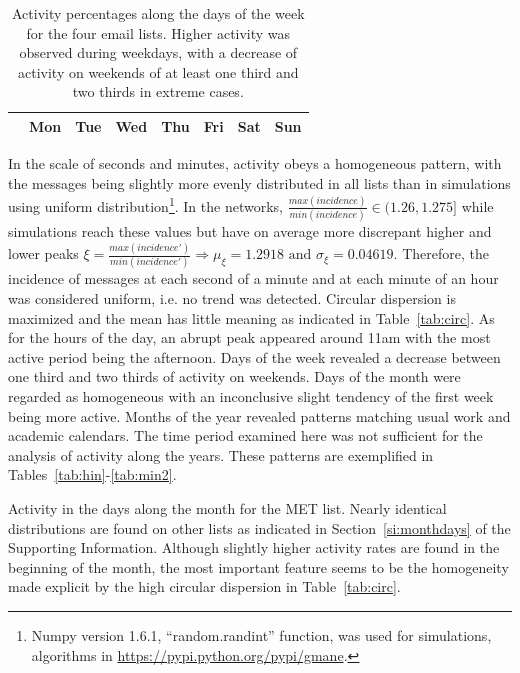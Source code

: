 \documentclass[%
	aip,
	jmp,%
	amsmath,amssymb,
	reprint,%
]{revtex4-1}
\begin{document}
\begin{table}
	\caption{Activity percentages along the days of the week for the four email lists. Higher activity was observed during weekdays, with a decrease of activity on weekends of at least one third and two thirds in extreme cases.}
	\begin{center}
		\begin{tabular}{ | l |  c | c | c | c | c |   c | c |}
			\hline
			& Mon & Tue & Wed & Thu & Fri & Sat & Sun  \\ \hline
			
		\end{tabular}
	\end{center}
	\label{tab:win}
\end{table}
In the scale of seconds and minutes, activity obeys a homogeneous pattern, with the messages being slightly more evenly distributed in all lists than in simulations using uniform distribution\footnote{Numpy version 1.6.1, ``random.randint'' function, was used for simulations, algorithms in \url{https://pypi.python.org/pypi/gmane}.}. In the networks, $\frac{max(incidence)}{min(incidence)} \in (1.26,1.275]$ while simulations reach these values but have on average more discrepant higher and lower peaks $\xi=\frac{max(incidence')}{min(incidence')} \Rightarrow \mu_\xi=1.2918 \text{ and } \sigma_\xi=0.04619$.
Therefore, the incidence of messages at each second of a minute and at each minute of an hour was considered uniform, i.e. no trend was detected. Circular dispersion is maximized and the mean has little meaning as indicated in Table~\ref{tab:circ}. As for the hours of the day, an abrupt peak appeared around 11am with the most active period being the afternoon. Days of the week revealed a decrease between one third and two thirds of activity on weekends. Days of the month were regarded as homogeneous with an inconclusive slight tendency of the first week being more active. Months of the year revealed patterns matching usual work and academic calendars. The time period examined here was not sufficient for the analysis of activity along the years. These patterns are exemplified in Tables~\ref{tab:hin}-\ref{tab:min2}.


\FloatBarrier

\begin{table}
	\caption{Activity in the days along the month for the MET list. Nearly identical distributions are found on other lists as indicated in Section~\ref{si:monthdays} of the Supporting Information. Although slightly higher activity rates are found in the beginning of the month, the most important feature seems to be the homogeneity made explicit by the high circular dispersion in Table~\ref{tab:circ}.}
	\footnotesize
	
	\label{tab:min}
\end{table}
\end{document}
